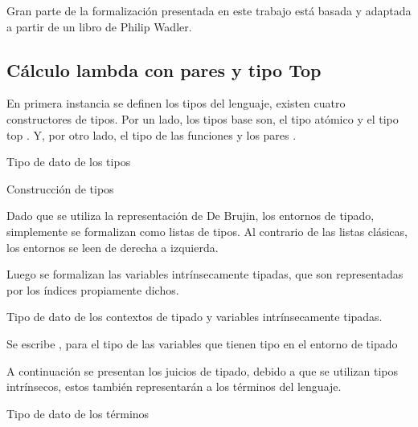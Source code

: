 Gran parte de la formalización presentada en este trabajo está basada y adaptada a partir de un libro de Philip Wadler\cite{plfa}.

\subsection{Cálculo lambda con pares y tipo Top}

En primera instancia se definen los tipos del lenguaje, existen cuatro constructores de tipos.
Por un lado, los tipos base son, el tipo atómico \const{$\tau$} y el tipo top \const{$\top$}.
Y, por otro lado, el tipo de las funciones \const{$\_\Rightarrow\_$} y los pares \const{$\_\times\_$}.

\begin{codigo}
	Tipo de dato de los tipos
	
\end{codigo}

\begin{example}
	Construcción de tipos
\end{example}

Dado que se utiliza la representación de De Brujin, los entornos de tipado, simplemente se formalizan como listas de tipos.
Al contrario de las listas clásicas, los entornos se leen de derecha a izquierda.

Luego se formalizan las variables intrínsecamente tipadas, que son representadas por los índices propiamente dichos.

\begin{codigo}
	Tipo de dato de los contextos de tipado y variables intrínsecamente tipadas.
\end{codigo}

\begin{example}
	Se escribe \bound{$\Gamma$} \const{$\ni$} , para el tipo de las variables que tienen tipo  en el entorno de tipado \bound{$\Gamma$}
\end{example}

A continuación se presentan los juicios de tipado, debido a que se utilizan tipos intrínsecos, estos también representarán a los términos del lenguaje.

\begin{codigo}
	Tipo de dato de los términos
	
\end{codigo}

